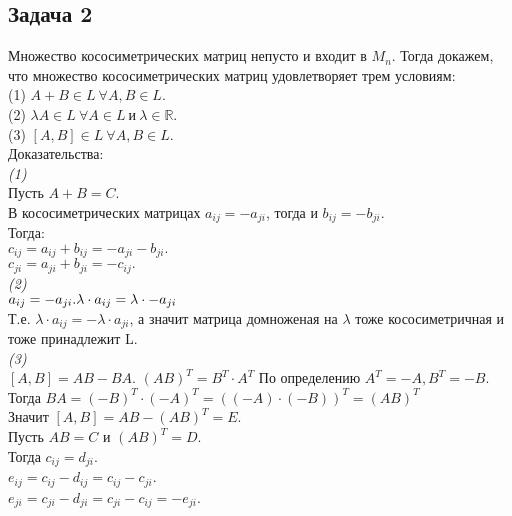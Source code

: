	\subsection{Задача 2} 
	Множество кососиметрических матриц непусто и входит в $M_n$. Тогда докажем, что множество кососиметрических матриц удовлетворяет трем условиям: \\
	(1) $A+B \in L \ \forall A,B \in L$.\\
	(2) $\lambda A \in L \ \forall A \in L\  и\  \lambda \in \mathbb{R}$.\\
	(3) $[A,B] \in L \ \forall A,B \in L$.\\
	Доказательства:\\
	\textit{(1)}\\
	Пусть $A+B = C$.\\
	В кососиметрических матрицах $a_{ij} = -a_{ji}$, тогда и $b_{ij} = -b_{ji}$.\\
	Тогда:\\
	 $c_{ij} = a_{ij} + b_{ij} = -a_{ji} - b_{ji}.$\\
	$c_{ji} = a_{ji} + b_{ji} = -c_{ij}.$\\
	\textit{(2)}\\
	 $a_{ij} = -a_{ji}.\\ \lambda \cdot a_{ij} = \lambda \cdot -a_{ji}$\\
	Т.е. $\lambda \cdot a_{ij} = -\lambda \cdot a_{ji}$, а значит матрица домноженая на $\lambda$ тоже кососиметричная и тоже принадлежит L. \\
	\textit{(3)}\\
	$[A, B] = AB - BA.$
	$(AB)^T = B^T \cdot A^T$
	По определению $A^T = -A, B^T = -B$.\\
	Тогда $BA = (-B)^T \cdot (-A)^T = ((-A) \cdot (-B))^T = (AB)^T$\\
	Значит $[A, B] = AB - (AB)^T = E$.\\
	Пусть $AB = C$ и $(AB)^T = D$.\\
	Тогда $c_{ij} = d_{ji}$.\\
	$e_{ij} = c_{ij} - d_{ij} = c_{ij} - c_{ji}$.\\
	$e_{ji} = c_{ji} - d_{ji} = c_{ji} - c_{ij} = - e_{ji}$.
	
	
